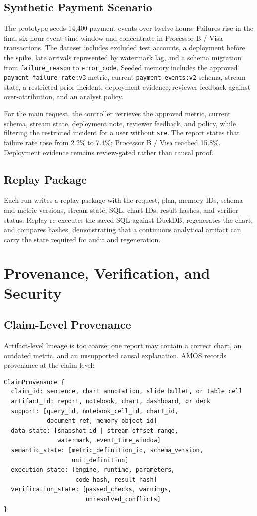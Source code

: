 \documentclass[10pt]{article}
\newcommand{\amos}{\textsc{AMOS}\xspace}
\newcommand{\code}[1]{\texttt{#1}}
\begin{document}
\subsection{Synthetic Payment Scenario}
The prototype seeds 14{,}400 payment events over twelve hours. Failures rise in the final six-hour event-time window and concentrate in Processor B / Visa transactions. The dataset includes excluded test accounts, a deployment before the spike, late arrivals represented by watermark lag, and a schema migration from \code{failure\_reason} to \code{error\_code}. Seeded memory includes the approved \code{payment\_failure\_rate:v3} metric, current \code{payment\_events:v2} schema, stream state, a restricted prior incident, deployment evidence, reviewer feedback against over-attribution, and an analyst policy.

For the main request, the controller retrieves the approved metric, current schema, stream state, deployment note, reviewer feedback, and policy, while filtering the restricted incident for a user without \code{sre}. The report states that failure rate rose from 2.2\% to 7.4\%; Processor B / Visa reached 15.8\%. Deployment evidence remains review-gated rather than causal proof.

\subsection{Replay Package}
Each run writes a replay package with the request, plan, memory IDs, schema and metric versions, stream state, SQL, chart IDs, result hashes, and verifier status. Replay re-executes the saved SQL against DuckDB, regenerates the chart, and compares hashes, demonstrating that a continuous analytical artifact can carry the state required for audit and regeneration.

\section{Provenance, Verification, and Security}

\subsection{Claim-Level Provenance}
Artifact-level lineage is too coarse: one report may contain a correct chart, an outdated metric, and an unsupported causal explanation. \amos records provenance at the claim level:

\begin{verbatim}
ClaimProvenance {
  claim_id: sentence, chart annotation, slide bullet, or table cell
  artifact_id: report, notebook, chart, dashboard, or deck
  support: [query_id, notebook_cell_id, chart_id,
            document_ref, memory_object_id]
  data_state: [snapshot_id | stream_offset_range,
               watermark, event_time_window]
  semantic_state: [metric_definition_id, schema_version,
                   unit_definition]
  execution_state: [engine, runtime, parameters,
                    code_hash, result_hash]
  verification_state: [passed_checks, warnings,
                       unresolved_conflicts]
}
\end{verbatim}
\end{document}
